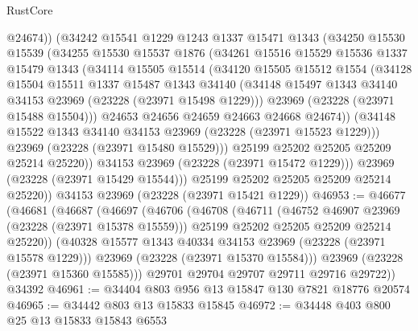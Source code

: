 \begin{lexlean}{RustCore}
\begin{coremodule}
              @24674))
          (@34242
            @15541
            @1229
            @1243
            @1337
            @15471
            @1343
            (@34250
              @15530
              @15539
              (@34255
                @15530
                @15537
                @1876
                (@34261
                  @15516
                  @15529
                  @15536
                  @1337
                  @15479
                  @1343
                  (@34114
                    @15505
                    @15514
                    (@34120
                      @15505
                      @15512
                      @1554
                      (@34128
                        @15504
                        @15511
                        @1337
                        @15487
                        @1343
                        @34140
                        (@34148 @15497 @1343 @34140 @34153 @23969 (@23228 (@23971 @15498 @1229)))
                        @23969
                        (@23228 (@23971 @15488 @15504)))
                      @24653
                      @24656
                      @24659
                      @24663
                      @24668
                      @24674))
                  (@34148 @15522 @1343 @34140 @34153 @23969 (@23228 (@23971 @15523 @1229)))
                  @23969
                  (@23228 (@23971 @15480 @15529)))
                @25199
                @25202
                @25205
                @25209
                @25214
                @25220))
            @34153
            @23969
            (@23228 (@23971 @15472 @1229)))
          @23969
          (@23228 (@23971 @15429 @15544)))
        @25199
        @25202
        @25205
        @25209
        @25214
        @25220))
    @34153
    @23969
    (@23228 (@23971 @15421 @1229))
@46953 := @46677
    (@46681
      (@46687
        (@46697
          (@46706
            (@46708
              (@46711
                (@46752 @46907 @23969 (@23228 (@23971 @15378 @15559)))
                @25199
                @25202
                @25205
                @25209
                @25214
                @25220))
            (@40328 @15577 @1343 @40334 @34153 @23969 (@23228 (@23971 @15578 @1229)))
            @23969
            (@23228 (@23971 @15370 @15584)))
          @23969
          (@23228 (@23971 @15360 @15585)))
        @29701
        @29704
        @29707
        @29711
        @29716
        @29722))
    @34392
@46961 := @34404 @803 @956 @13 @15847 @130 @7821 @18776 @20574
@46965 := @34442 @803 @13 @15833 @15845
@46972 := @34448 @403 @800 @25 @13 @15833 @15843 @6553

\end{coremodule}
\end{lexlean}
